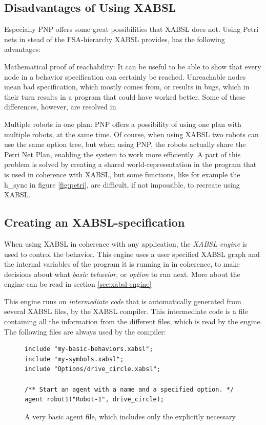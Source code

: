 \documentclass[a4paper,10pt]{article}
\begin{document}
\subsection{Disadvantages of Using XABSL}
Especially PNP offers some great possibilities that XABSL does not. Using Petri
nets in stead of the FSA-hierarchy XABSL provides, has the following advantages:
\begin{itemize*}
    \item Mathematical proof of reachability: It can be useful to be able to
    show that every node in a behavior specification can certainly be reached.
    Unreachable nodes mean bad specification, which mostly comes from, or
    results in bugs, which in their turn results in a program that could have
    worked better. Some of these differences, however, are resolved in
    \cite{alur1998model}
    \item Multiple robots in one plan: PNP offers a possibility of using one
    plan with multiple robots, at the same time. Of course, when using XABSL two
    robots can use the same option tree, but when using PNP, the robots actually
    share the Petri Net Plan, enabling the system to work more efficiently. A
    part of this problem is solved by creating a shared world-representation in
    the program that is used in coherence with XABSL, but some functions, like
    for example the h\_sync in figure \ref{fig:petri}, are difficult, if not
    impossible, to recreate using XABSL.
\end{itemize*}

\subsection{Creating an XABSL-specification}
\label{sec:xabsl-hierarchy}
When using XABSL in coherence with any application, the \textit{XABSL engine} is
used to control the behavior. This engine uses a user specified XABSL graph and
the internal variables of the program it is running in in coherence, to make
decisions about what \textit{basic behavior}, or \textit{option} to run next.
More about the engine can be read in section \ref{sec:xabsl-engine}

This engine runs on \textit{intermediate code} that is automatically generated
from several XABSL files, by the XABSL compiler. This intermediate code is a
file containing all the information from the different files, which is read by
the engine. The following files are always used by the compiler:
\begin{figure}
\centering
{}
\begin{lstlisting}
include "my-basic-behaviors.xabsl";
include "my-symbols.xabsl";
include "Options/drive_circle.xabsl";

/** Start an agent with a name and a specified option. */
agent robot1("Robot-1", drive_circle);
\end{lstlisting}
\caption{A very basic agent file, which includes only the explicitly
necessary}
\label{fig:agent}
\end{figure}
\end{document}
